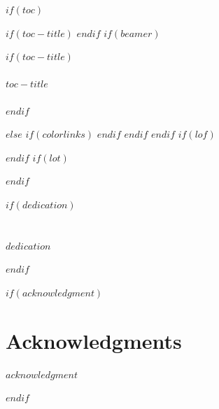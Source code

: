 $if(toc)$
\pagebreak

\setcounter{secnumdepth}{10} %

\newlength{\scratchlength}%

\renewcommand{\cftchappresnum}{Chapter }
\settowidth{\scratchlength}{\bfseries\cftchappresnum\cftchapaftersnum}%
\addtolength{\cftchapnumwidth}{\scratchlength} %

\renewcommand{\cftchapleader}{\cftdotfill{\cftdotsep}}

$if(toc-title)$
\renewcommand*\contentsname{$toc-title$}
$endif$
$if(beamer)$
\begin{frame}[allowframebreaks]
  $if(toc-title)$
  \frametitle{$toc-title$}
  $endif$
  \tableofcontents[hideallsubsections]
\end{frame}
$else$
{
    $if(colorlinks)$
    \hypersetup{linkcolor=$if(toccolor)$$toccolor$$else$$endif$}
    $endif$
    \setcounter{tocdepth}{$toc-depth$}
    \tableofcontents
  }
$endif$
$endif$
$if(lof)$

\renewcommand{\cftfigpresnum}{Figure~}
\setlength{\cftfignumwidth}{6em}
\renewcommand{\cftfigaftersnum}{:}

\listoffigures
$endif$
$if(lot)$

\renewcommand{\cfttabpresnum}{Table~}
\setlength{\cfttabnumwidth}{6em}
\renewcommand{\cfttabaftersnum}{:}

\listoftables
$endif$

$if(dedication)$
\chapter*{}
\thispagestyle{empty}
\begin{center}
  \textit{\large $dedication$}
\end{center}
$endif$

$if(acknowledgment)$
\chapter{Acknowledgments}
\begin{doublespace}
  $acknowledgment$
\end{doublespace}
$endif$